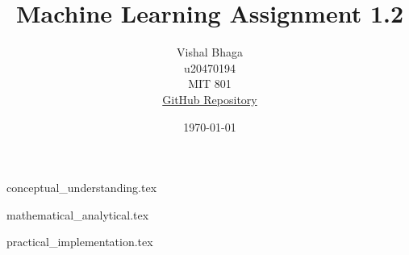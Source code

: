 \documentclass[11pt,a4paper]{article}
\title{Machine Learning Assignment 1.2}
\author{
    Vishal Bhaga\\
    u20470194\\
    MIT 801\\
    \href{https://github.com/vbhaga89/MIT801_Assignment2.git}{GitHub Repository}
}
\date{\today}
\begin{document}
\onehalfspacing

\maketitle

{conceptual_understanding.tex}

\newpage

{mathematical_analytical.tex}

\newpage

{practical_implementation.tex}

\newpage

\printbibliography
\end{document}
